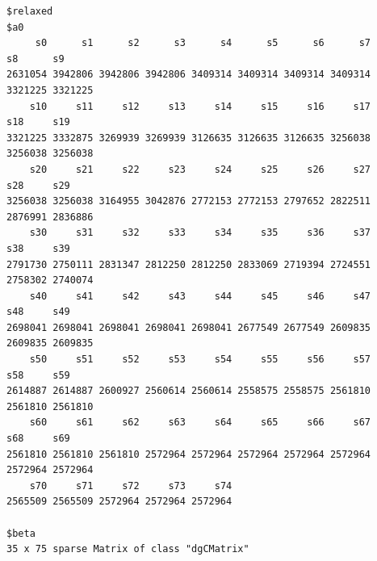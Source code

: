 \documentclass[
]{article}
\begin{document}
\begin{verbatim}
$relaxed
$a0
     s0      s1      s2      s3      s4      s5      s6      s7      s8      s9 
2631054 3942806 3942806 3942806 3409314 3409314 3409314 3409314 3321225 3321225 
    s10     s11     s12     s13     s14     s15     s16     s17     s18     s19 
3321225 3332875 3269939 3269939 3126635 3126635 3126635 3256038 3256038 3256038 
    s20     s21     s22     s23     s24     s25     s26     s27     s28     s29 
3256038 3256038 3164955 3042876 2772153 2772153 2797652 2822511 2876991 2836886 
    s30     s31     s32     s33     s34     s35     s36     s37     s38     s39 
2791730 2750111 2831347 2812250 2812250 2833069 2719394 2724551 2758302 2740074 
    s40     s41     s42     s43     s44     s45     s46     s47     s48     s49 
2698041 2698041 2698041 2698041 2698041 2677549 2677549 2609835 2609835 2609835 
    s50     s51     s52     s53     s54     s55     s56     s57     s58     s59 
2614887 2614887 2600927 2560614 2560614 2558575 2558575 2561810 2561810 2561810 
    s60     s61     s62     s63     s64     s65     s66     s67     s68     s69 
2561810 2561810 2561810 2572964 2572964 2572964 2572964 2572964 2572964 2572964 
    s70     s71     s72     s73     s74 
2565509 2565509 2572964 2572964 2572964 

$beta
35 x 75 sparse Matrix of class "dgCMatrix"
\end{verbatim}
\end{document}
